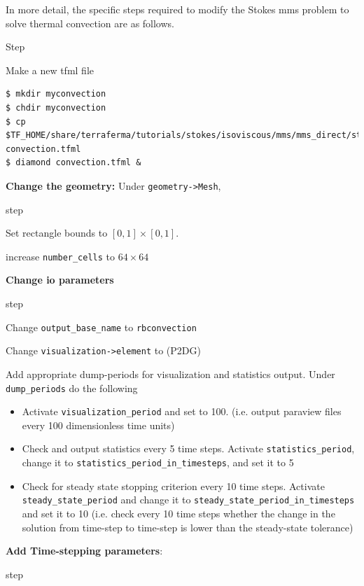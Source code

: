 In more detail, the specific steps required to modify the Stokes mms
problem to solve thermal convection are as follows.
\begin{steps}{Step}
\item Make a new tfml file
  \begin{lstlisting}[style=Bash]
$ mkdir myconvection
$ chdir myconvection
$ cp $TF_HOME/share/terraferma/tutorials/stokes/isoviscous/mms/mms_direct/stokes.tfml convection.tfml
$ diamond convection.tfml &
  \end{lstlisting}%
\item \textbf{Change the geometry:} Under \texttt{geometry->Mesh},
  \begin{steps}{step}

  \item Set rectangle bounds to  $[0,1]\times[0,1]$. 
  \item increase \texttt{number\_cells} to $64\times64$
  \end{steps}
\item \textbf{Change io parameters}
  \begin{steps}{step}
  \item Change \texttt{output\_base\_name} to \texttt{rbconvection}
  \item Change \texttt{visualization->element} to (P2DG)
  \item Add appropriate dump-periods for visualization and statistics
    output.  Under \texttt{dump\_periods} do the following
    \begin{itemize}
    \item Activate \texttt{visualization\_period} and set to
      100. (i.e. output paraview files every 100 dimensionless time units)
    \item Check and output statistics every 5 time steps. Activate
      \texttt{statistics\_period}, change it to
      \texttt{statistics\_period\_in\_timesteps}, and set it to 5
    \item Check for steady state stopping criterion every 10 time
      steps. Activate \texttt{steady\_state\_period} and change it to
      \texttt{steady\_state\_period\_in\_timesteps} and set it to 10
      (i.e. check every 10 time steps  whether the change in the solution from   time-step to time-step is lower than the steady-state tolerance)
    \end{itemize}
  \end{steps}
\item \textbf{Add Time-stepping parameters}:
  \begin{steps}{step}

\end{steps}
\end{steps}

